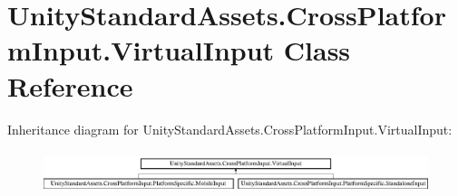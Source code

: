 \hypertarget{class_unity_standard_assets_1_1_cross_platform_input_1_1_virtual_input}{}\section{Unity\+Standard\+Assets.\+Cross\+Platform\+Input.\+Virtual\+Input Class Reference}
\label{class_unity_standard_assets_1_1_cross_platform_input_1_1_virtual_input}
Inheritance diagram for Unity\+Standard\+Assets.\+Cross\+Platform\+Input.\+Virtual\+Input\+:\begin{figure}[H]
\begin{center}
\leavevmode
\includegraphics[height=1.284404cm]{class_unity_standard_assets_1_1_cross_platform_input_1_1_virtual_input}
\end{center}
\end{figure}
